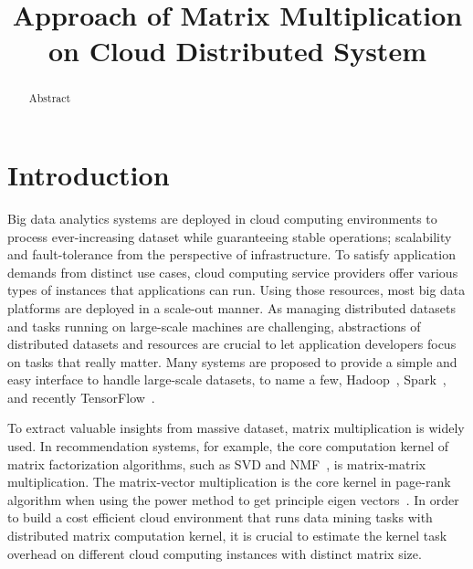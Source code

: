 \documentclass[10pt, conference, compsocconf]{IEEEtran}
\begin{document}

\title{Approach of Matrix Multiplication on Cloud Distributed System}


\author{
\and
{}
}

\maketitle

\begin{abstract}
Abstract
\end{abstract}

\IEEEpeerreviewmaketitle

\section{Introduction}\label{sec:intro}
Big data analytics systems are deployed in cloud computing environments to process ever-increasing dataset while guaranteeing stable operations; scalability and fault-tolerance from the perspective of infrastructure. To satisfy application demands from distinct use cases, cloud computing service providers offer various types of instances that applications can run. Using those resources, most big data platforms are deployed in a scale-out manner. As managing distributed datasets and tasks running on large-scale machines are challenging, abstractions of distributed datasets and resources are crucial to let application developers focus on tasks that really matter. Many systems are proposed to provide a simple and easy interface to handle large-scale datasets, to name a few, Hadoop~\cite{hadoop}, Spark~\cite{spark}, and recently TensorFlow~\cite{tensorflow}.

To extract valuable insights from massive dataset, matrix multiplication is widely used. In recommendation systems, for example, the core computation kernel of matrix factorization algorithms, such as SVD and NMF~\cite{nmf}, is matrix-matrix multiplication. The matrix-vector multiplication is the core kernel in page-rank algorithm when using the power method to get principle eigen vectors~\cite{pagerank}. In order to build a cost efficient cloud environment that runs data mining tasks with distributed matrix computation kernel, it is crucial to estimate the kernel task overhead on different cloud computing instances with distinct matrix size. 
\end{document}
